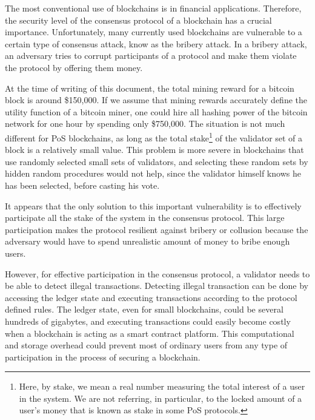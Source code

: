 The most conventional use of blockchains is in financial applications. Therefore, the security level of the consensus
protocol of a blockchain has a crucial importance. Unfortunately, many currently used blockchains are vulnerable to a
certain type of consensus attack, know as the bribery attack. In a bribery attack, an adversary tries to corrupt
participants of a protocol and make them violate the protocol by offering them money.

At the time of writing of this document,
the total mining reward for a bitcoin block is around \$150,000. If we assume that mining rewards accurately define
the utility function of a bitcoin miner, one could hire all hashing power of the bitcoin network for one hour by
spending
only \$750,000. The situation is not much different for PoS blockchains, as long as the total stake\footnote{Here, by
stake, we mean a real number measuring the total interest of a user in the system. We are not referring, in
particular, to the locked amount of a user's money that is known as stake in some PoS protocols.}
of the validator set of a block is a relatively small value. This problem is more severe in blockchains that use
randomly selected small sets of validators, and selecting these random sets by hidden random procedures would not
help, since the validator himself knows he has been selected, before casting his vote.

It appears that the only solution to this important vulnerability is to effectively participate all the stake of the
system in the consensus protocol. This large participation makes the protocol resilient against bribery or
collusion because the adversary would have to spend unrealistic amount of money to bribe enough users.

However, for effective participation in the consensus protocol, a validator needs to be able to detect
illegal transactions. Detecting illegal transaction can be done by accessing the ledger
state and executing transactions according to the protocol defined rules. The
ledger state, even for small blockchains, could be several
hundreds of gigabytes, and executing transactions could easily become costly when a blockchain is acting as a
smart contract platform. This computational and storage overhead could prevent most of
ordinary users from any type of participation in the process of securing a blockchain.

